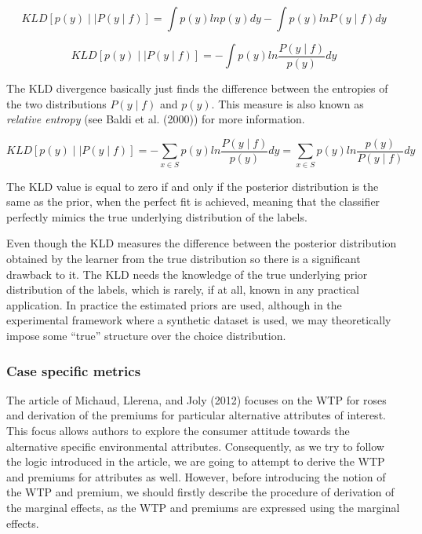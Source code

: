 \documentclass[12pt,]{article}
\begin{document}
\begin{equation}
KLD [p(y) \mid \mid P (y \mid f) ] =
  \int p(y) ln p(y) dy - 
  \int p(y) ln P(y \mid f) dy
\end{equation}

\begin{equation}
KLD [p(y) \mid \mid P (y \mid f) ] =
  - \int p(y) ln \frac{P(y \mid f)}{p(y)} dy
\end{equation}

The KLD divergence basically just finds the difference between the
entropies of the two distributions \(P (y \mid f)\) and \(p(y)\). This
measure is also known as \emph{relative entropy} (see Baldi et al.
(2000)) for more information.

\begin{equation}
KLD [p(y) \mid \mid P (y \mid f) ] = 
  - \sum_{x \in S} p(y) ln \frac{P(y \mid f)}{p(y)} dy = \sum_{x \in S} p(y) ln \frac{p(y)}{P(y \mid f)} dy
\end{equation}

The KLD value is equal to zero if and only if the posterior distribution
is the same as the prior, when the perfect fit is achieved, meaning that
the classifier perfectly mimics the true underlying distribution of the
labels.

Even though the KLD measures the difference between the posterior
distribution obtained by the learner from the true distribution so there
is a significant drawback to it. The KLD needs the knowledge of the true
underlying prior distribution of the labels, which is rarely, if at all,
known in any practical application. In practice the estimated priors are
used, although in the experimental framework where a synthetic dataset
is used, we may theoretically impose some ``true'' structure over the
choice distribution.

\hypertarget{case-specific-metrics}{%
\subsubsection{Case specific metrics}\label{case-specific-metrics}}

The article of Michaud, Llerena, and Joly (2012) focuses on the WTP for
roses and derivation of the premiums for particular alternative
attributes of interest. This focus allows authors to explore the
consumer attitude towards the alternative specific environmental
attributes. Consequently, as we try to follow the logic introduced in
the article, we are going to attempt to derive the WTP and premiums for
attributes as well. However, before introducing the notion of the WTP
and premium, we should firstly describe the procedure of derivation of
the marginal effects, as the WTP and premiums are expressed using the
marginal effects.
\end{document}

